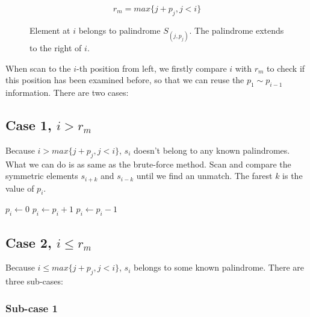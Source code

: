 \documentclass[b5paper]{article}
\begin{document}
\begin{equation}
r_m = max \{ j + p_j, j < i\}
\end{equation}

\begin{figure}[htbp]
\centering
{}
\caption{Element at $i$ belongs to palindrome $S_{(j, p_j)}$. The palindrome extends to the right of $i$.}
\label{fig:right-most}
\end{figure}

When scan to the $i$-th position from left, we firstly compare $i$ with $r_m$ to check if this position
has been examined before, so that we can reuse the $p_1 \sim p_{i-1}$ information. There are two cases:

\subsection*{Case 1, $i > r_m$}

Because $i > max \{j+p_j, j < i \}$, $s_i$ doesn't belong to any known palindromes. What we can do is as
same as the brute-force method. Scan and compare the symmetric elements $s_{i+k}$ and $s_{i-k}$ until we
find an unmatch. The farest $k$ is the value of $p_i$.

\begin{algorithmic}[1]
  \State $p_i \gets 0$
    \State $p_i \gets p_i + 1$
  \EndWhile
  \State $p_i \gets p_i - 1$
\EndIf
\end{algorithmic}


\subsection*{Case 2, $i \leq r_m$}

Because $i \leq max \{j + p_j, j < i\}$, $s_i$ belongs to some known palindrome. There are three sub-cases:

\subsubsection*{Sub-case 1}
\end{document}
